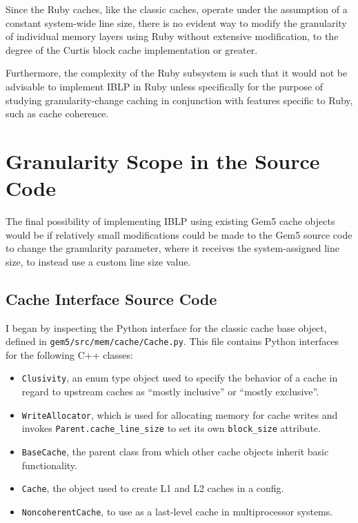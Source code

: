 \documentclass[12pt,twoside]{reedthesis}
\begin{document}
	Since the Ruby caches, like the classic caches, operate under the assumption of a constant system-wide line size, there is no evident way to modify the granularity of individual memory layers using Ruby without extensive modification, to the degree of the Curtis block cache implementation or greater.

	Furthermore, the complexity of the Ruby subsystem is such that it would not be advisable to implement IBLP in Ruby unless specifically for the purpose of studying granularity-change caching in conjunction with features specific to Ruby, such as cache coherence.

\section{Granularity Scope in the Source Code}

	The final possibility of implementing IBLP using existing Gem5 cache objects would be if relatively small modifications could be made to the Gem5 source code to change the granularity parameter, where it receives the system-assigned line size, to instead use a custom line size value.

	\subsection*{Cache Interface Source Code}

	I began by inspecting the Python interface for the classic cache base object, defined in \verb`gem5/src/mem/cache/Cache.py`. This file contains Python interfaces for the following C++ classes:
	\begin{itemize}
		\item \verb`Clusivity`, an enum type object used to specify the behavior of a cache in regard to upstream caches as ``mostly inclusive'' or ``mostly exclusive''.
		\item \verb`WriteAllocator`, which is used for allocating memory for cache writes and invokes \verb`Parent.cache_line_size` to set its own \verb`block_size` attribute.
		\item \verb`BaseCache`, the parent class from which other cache objects inherit basic functionality.
		\item \verb`Cache`, the object used to create L1 and L2 caches in a config.
		\item \verb`NoncoherentCache`, to use as a last-level cache in multiprocessor systems.
	\end{itemize}
\end{document}
